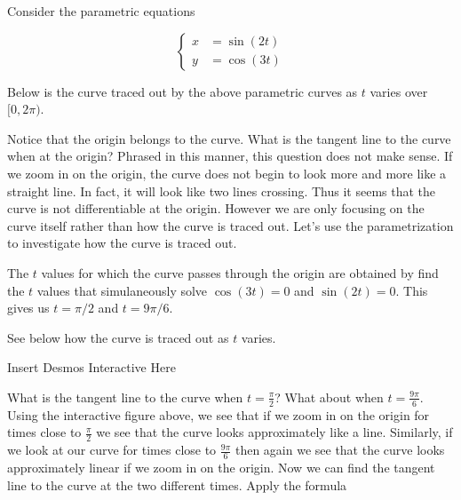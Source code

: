 \documentclass{ximera}
\begin{document}
\begin{example}

Consider the parametric equations 

\[ 
\begin{cases}
x&=\sin(2t) \\
y&=\cos(3t)
\end{cases}
\]

Below is the curve traced out by the above parametric curves as $t$ varies over $[0, 2\pi)$. 

\begin{image}
\end{image}

Notice that the origin belongs to the curve. What is the tangent line to the curve when at the origin?  Phrased in this manner, this question does not make sense. If we zoom in on
the origin, the curve does not begin to look more and more like a straight line. In fact, it will look like two lines crossing. Thus it seems that the curve is not differentiable at the origin. However we are only focusing on the curve itself rather than how the curve is traced out. Let's use the parametrization to investigate how the curve is traced out. 

The $t$ values for which the curve passes through the origin are obtained by find the $t$ values that simulaneously solve $\cos(3t)=0$ and $\sin(2t)=0$. 
This gives us $t=\pi/2$ and $t=9\pi/6$. 

See below how the curve is traced out as $t$ varies. 


Insert Desmos Interactive Here


What is the tangent line to the curve when $t=\frac{\pi}{2}$? What about when $t=\frac{9\pi}{6}$. Using the interactive figure above, we see that if we zoom in on the origin for times close to $\frac{\pi}{2}$ we see that the curve looks approximately like a line. Similarly, if we look at our curve for times close to $\frac{9\pi}{6}$ then again we see that the curve looks approximately linear if we zoom in on the origin. Now we can find the tangent line to the curve at the two different times. 
Apply the formula 



\end{example}
\end{document}
